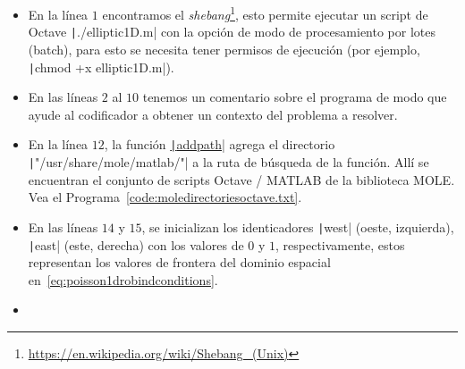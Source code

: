 \begin{itemize}
    \item

          En la línea $1$ encontramos el
          \emph{shebang}\footnote{\url{https://en.wikipedia.org/wiki/Shebang_(Unix)}},
          esto permite ejecutar un script de Octave
          \texttt|./elliptic1D.m| con la opción de modo de
          procesamiento por lotes (batch), para esto se necesita
          tener permisos de ejecución (por ejemplo,
          \texttt|chmod +x elliptic1D.m|).

    \item

          En las líneas $2$ al $10$ tenemos un comentario sobre el
          programa de modo que ayude al codificador a obtener un
          contexto del problema a resolver.

    \item

          En la línea $12$, la función
          \href{https://docs.octave.org/v9.3.0/Manipulating-the-Load-Path.html#index-addpath}{\texttt|addpath|}
          agrega el directorio
          \texttt|"/usr/share/mole/matlab/"| a la ruta de
          búsqueda de la función.
          Allí se encuentran el conjunto de scripts Octave / MATLAB
          de la biblioteca MOLE.
          Vea el Programa~\ref{code:moledirectoriesoctave.txt}.

    \item

          En las líneas $14$ y $15$, se inicializan los identicadores
          \texttt|west| (oeste, izquierda),
          \texttt|east| (este, derecha) con los valores
          de $0$ y $1$, respectivamente, estos representan los
          valores de frontera del dominio espacial
          en~\eqref{eq:poisson1drobindconditions}.

    \item


\end{itemize}
